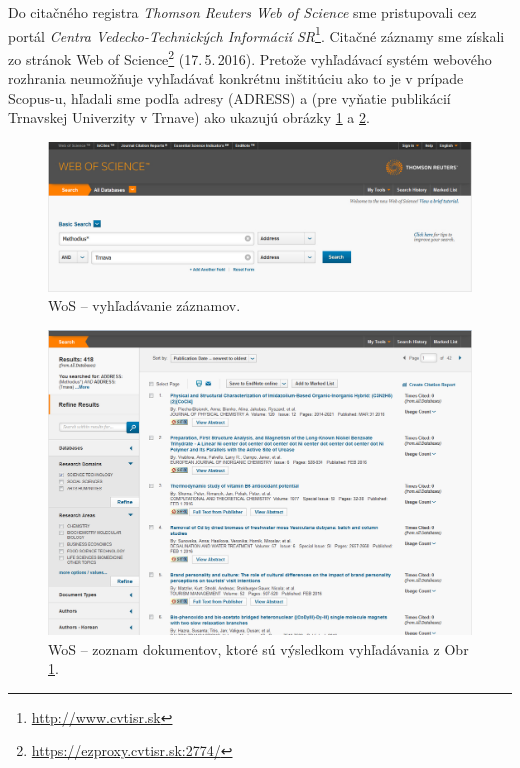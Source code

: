 Do citačného registra \emph{Thomson Reuters Web of Science} sme pristupovali cez
portál \emph{Centra Vedecko-Technických Informácií
  SR}\footnote{\url{http://www.cvtisr.sk}}. Citačné záznamy sme získali zo
stránok Web of Science\footnote{\url{https://ezproxy.cvtisr.sk:2774/}}
(17.\,5.\,2016). Pretože vyhľadávací systém webového rozhrania neumožňuje
vyhľadávať konkrétnu inštitúciu ako to je v prípade Scopus-u, hľadali sme podľa
adresy (ADRESS)  a  (pre vyňatie publikácií Trnavskej
Univerzity v Trnave) ako ukazujú obrázky \ref{fig:wos.search} a
\ref{fig:wos.documentlist}.

\begin{figure}
  \centering
  \includegraphics[width=\textwidth]{obr/wos01-cut.jpg}
  \caption{WoS -- vyhľadávanie záznamov.}
  \label{fig:wos.search}
\end{figure}

\begin{figure}
  \centering
  \includegraphics[width=\textwidth]{obr/wos02-cut.jpg}
  \caption{WoS -- zoznam dokumentov, ktoré sú výsledkom vyhľadávania z Obr\,\ref{fig:wos.search}.}
  \label{fig:wos.documentlist}
\end{figure}

